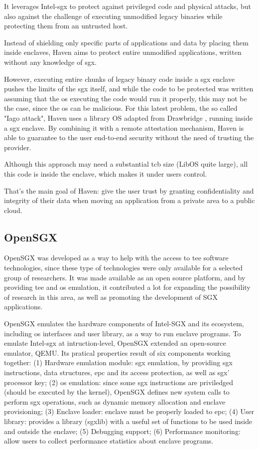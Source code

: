 It leverages Intel-\gls{sgx} to protect against privileged code and physical attacks, but also against the challenge of executing unmodified legacy binaries while protecting them from an untrusted host.

Instead of shielding only specific parts of applications and data by placing them inside enclaves, Haven aims to protect entire unmodified applications, written without any knowledge of \gls{sgx}. 

However, executing entire chunks of legacy binary code inside a \gls{sgx} enclave pushes the limits of the \gls{sgx} itself, and while the code to be protected was written assuming that the \gls{os} executing the code would run it properly, this may not be the case, since the \gls{os} can be malicious. For this latest problem, the so called "Iago attack", Haven uses a library OS adapted from Drawbridge \cite{drawbridge}, running inside a \gls{sgx} enclave. 
By combining it with a remote attestation mechanism, Haven is able to guarantee to the user end-to-end security without the need of trusting the provider.

Although this approach may need a substantial \gls{tcb} size (LibOS quite large), all this code is inside the enclave, which makes it under users control. 

That's the main goal of Haven: give the user trust by granting confidentiality and integrity of their data when moving an application from a private area to a public cloud. 


\subsection{OpenSGX}

OpenSGX \cite{opensgx_paper} was developed as a way to help with the access to \gls{tee} software technologies, since these type of technologies were only available for a selected group of researchers. 
It was made available as an open source platform, and by providing \gls{tee} and \gls{os} emulation, it contributed a lot for expanding the possibility of research in this area, as well as promoting the development of SGX applications. 

OpenSGX emulates the hardware components of Intel-SGX and its ecosystem, including \gls{os} interfaces and user library, as a way to run enclave programs. To emulate Intel-\gls{sgx} at intruction-level, OpenSGX extended an open-source emulator, QEMU.
Its pratical properties result of six components working together: (1) Hardware emulation module: \gls{sgx} emulation, by providing \gls{sgx} instructions, data structures, \gls{epc} and its access protection, as well as \gls{sgx}' processor key; (2) \gls{os} emulation: since some \gls{sgx} instructions are priviledged (should be executed by the kernel), OpenSGX defines new system calls to perform \gls{sgx} operations, such as dynamic memory allocation and enclave provisioning; (3) Enclave loader: enclave must be properly loaded to \gls{epc}; (4) User library: provides a library (sgxlib) with a useful set of functions to be used inside and outside the enclave; (5) Debugging support; (6) Performance monitoring: allow users to collect performance statistics about enclave programs.

